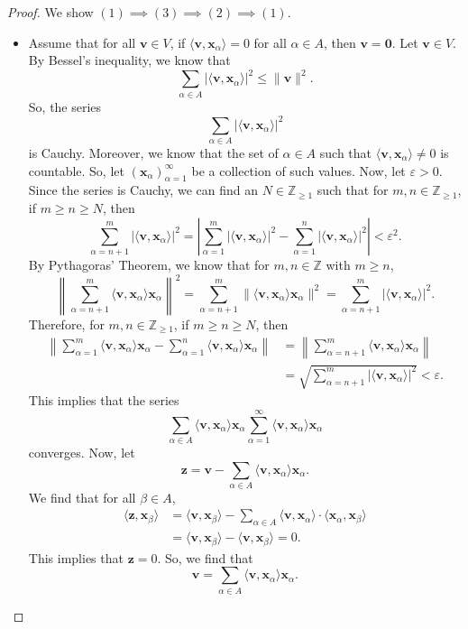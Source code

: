 \documentclass[a4paper, openany]{memoir}
\theoremstyle{definition}
\theoremstyle{plain}
\begin{document}
    \begin{proof}
        We show $(1) \implies (3) \implies (2) \implies (1)$.
        \begin{itemize}            
            \item Assume that for all $\bm{v} \in V$, if $\langle \bm{v}, \bm{x}_\alpha \rangle = 0$ for all $\alpha \in A$, then $\bm{v} = \bm{0}$. Let $\bm{v} \in V$. By Bessel's inequality, we know that
            \[\sum_{\alpha \in A} |\langle \bm{v}, \bm{x}_\alpha \rangle|^2 \leq \lVert \bm{v} \rVert^2.\]
            So, the series 
            \[\sum_{\alpha \in A} |\langle \bm{v}, \bm{x}_\alpha \rangle|^2\]
            is Cauchy. Moreover, we know that the set of $\alpha \in A$ such that $\langle \bm{v}, \bm{x}_\alpha \rangle \neq 0$ is countable. So, let $(\bm{x}_\alpha)_{\alpha=1}^\infty$ be a collection of such values. Now, let $\varepsilon > 0$. Since the series is Cauchy, we can find an $N \in \mathbb{Z}_{\geq 1}$ such that for $m, n \in \mathbb{Z}_{\geq 1}$, if $m \geq n \geq N$, then
            \[\sum_{\alpha=n+1}^m |\langle \bm{v}, \bm{x}_\alpha \rangle|^2 = \left|\sum_{\alpha=1}^m |\langle \bm{v}, \bm{x}_\alpha \rangle|^2 - \sum_{\alpha=1}^n |\langle \bm{v}, \bm{x}_\alpha \rangle|^2\right| < \varepsilon^2.\]
            By Pythagoras' Theorem, we know that for $m, n \in \mathbb{Z}$ with $m \geq n$,
            \[\left\lVert\sum_{\alpha=n+1}^m \langle \bm{v}, \bm{x}_\alpha \rangle \bm{x}_\alpha \right\rVert^2 = \sum_{\alpha=n+1}^m \lVert \langle \bm{v}, \bm{x}_\alpha \rangle \bm{x}_\alpha \rVert^2 = \sum_{\alpha=n+1}^m |\langle \bm{v}, \bm{x}_\alpha \rangle|^2.\]
            Therefore, for $m, n \in \mathbb{Z}_{\geq 1}$, if $m \geq n \geq N$, then
            \begin{align*}
                \left\lVert \sum_{\alpha=1}^m \langle \bm{v}, \bm{x}_\alpha \rangle \bm{x}_\alpha - \sum_{\alpha=1}^n \langle \bm{v}, \bm{x}_\alpha \rangle \bm{x}_\alpha \right\rVert &= \left\lVert\sum_{\alpha=n+1}^m \langle \bm{v}, \bm{x}_\alpha \rangle \bm{x}_\alpha \right\rVert \\
                &= \sqrt{\sum_{\alpha=n+1}^m |\langle \bm{v}, \bm{x}_\alpha \rangle|^2} < \varepsilon.
            \end{align*}
            This implies that the series 
            \[\sum_{\alpha \in A} \langle \bm{v}, \bm{x}_\alpha \rangle \bm{x}_\alpha \sum_{\alpha=1}^\infty \langle \bm{v}, \bm{x}_\alpha \rangle \bm{x}_\alpha\]
            converges. Now, let
            \[\bm{z} = \bm{v} - \sum_{\alpha \in A} \langle \bm{v}, \bm{x}_\alpha \rangle \bm{x}_\alpha.\]
            We find that for all $\beta \in A$,
            \begin{align*}
                \langle \bm{z}, \bm{x}_\beta \rangle &= \langle \bm{v}, \bm{x}_\beta \rangle - \sum_{\alpha \in A} \langle \bm{v}, \bm{x}_\alpha \rangle \cdot \langle \bm{x}_\alpha, \bm{x}_\beta \rangle \\
                &= \langle \bm{v}, \bm{x}_\beta \rangle - \langle \bm{v}, \bm{x}_\beta \rangle = 0.
            \end{align*}
            This implies that $\bm{z} = 0$. So, we find that
            \[\bm{v} = \sum_{\alpha \in A} \langle \bm{v}, \bm{x}_\alpha \rangle \bm{x}_\alpha.\]
            

\end{itemize}
\end{proof}
\end{document}
